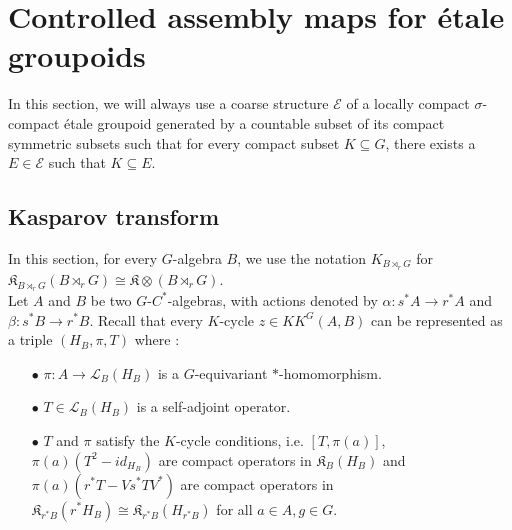 \section{Controlled assembly maps for étale groupoids}

In this section, we will always use a coarse structure $\mathcal E$ of a locally compact $\sigma$-compact étale groupoid generated by a countable subset of its compact symmetric subsets such that for every compact subset $K\subseteq G$, there exists a $E\in\mathcal E$ such that $K\subseteq E$.

\subsection{Kasparov transform} %


In this section, for every $G$-algebra $B$, we use the notation $K_{B\rtimes_r G}$ for $\mathfrak K_{B \rtimes_r G}(B \rtimes_r G)\cong \mathfrak K \otimes (B\rtimes_r G)$.\\

Let $A$ and $B$ be two $G$-$C^*$-algebras, with actions denoted by $\alpha : s^* A \rightarrow r^* A$ and $\beta : s^* B \rightarrow r^* B$. %
Recall that every $K$-cycle $z\in KK^G(A,B)$ can be represented as a triple $(H_B, \pi, T)$ where :
\begin{itemize}
\item[$\bullet$]$\pi : A\rightarrow \mathcal L_B(H_B)$ is a $G$-equivariant $*$-homomorphism.
\item[$\bullet$]$T\in \mathcal L_B(H_B)$ is a self-adjoint operator.
\item[$\bullet$] $T$ and $\pi$ satisfy the $K$-cycle conditions, i.e. $[T,\pi(a)]$, $\pi(a)(T^2-id_{H_B})$ are compact operators in $\mathfrak K_B(H_B)$ and $\pi(a)(r^*T-Vs^*T V^*)$ are compact operators in $\mathfrak K_{r^* B}(r^* H_B)\cong \mathfrak K_{r^* B}(H_{r^* B})$ for all $a\in A, g\in G$.\\
\end{itemize}

